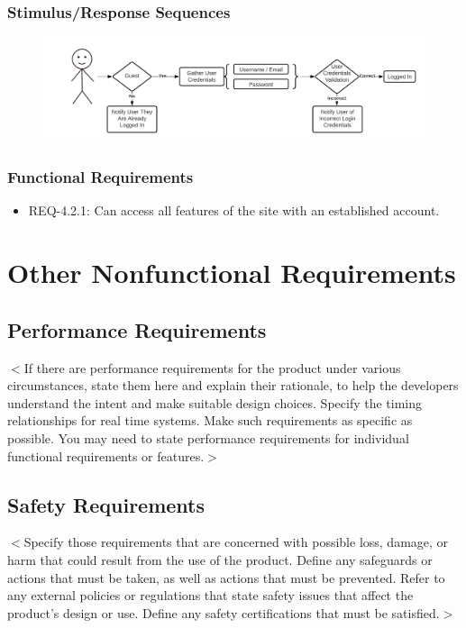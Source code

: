 \documentclass{scrreprt}
\begin{document}
\subsection{Stimulus/Response Sequences}

\begin{figure}[H]\centering
    \includegraphics[width=\columnwidth]{FlowCharts/Security-Login.png}
\end{figure}

\subsection{Functional Requirements}

\begin{itemize}
    \item REQ-4.2.1: Can access all features of the site with an established account.
\end{itemize}

\chapter{Other Nonfunctional Requirements}

\section{Performance Requirements}
$<$If there are performance requirements for the product under various 
circumstances, state them here and explain their rationale, to help the 
developers understand the intent and make suitable design choices. Specify the 
timing relationships for real time systems. Make such requirements as specific 
as possible. You may need to state performance requirements for individual 
functional requirements or features.$>$

\section{Safety Requirements}
$<$Specify those requirements that are concerned with possible loss, damage, or 
harm that could result from the use of the product. Define any safeguards or 
actions that must be taken, as well as actions that must be prevented. Refer to 
any external policies or regulations that state safety issues that affect the 
product’s design or use. Define any safety certifications that must be 
satisfied.$>$
\end{document}
